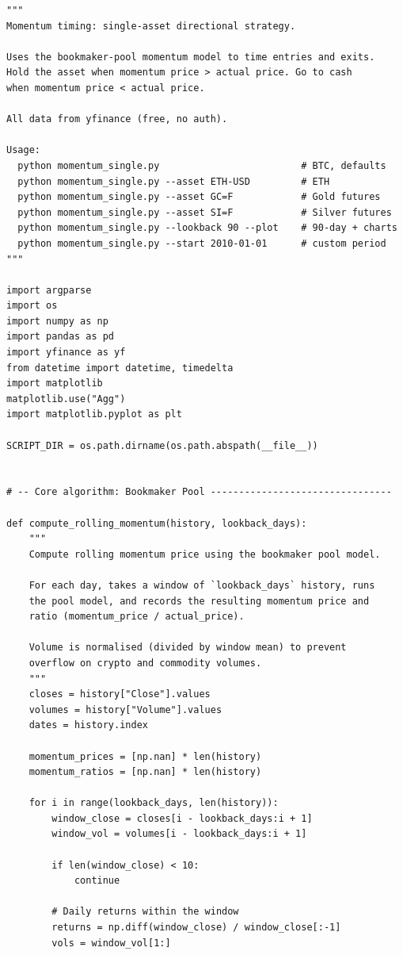 \documentclass[11pt,a4paper]{article}
\begin{document}
\begin{codebox}
\begin{lstlisting}[style=python]
"""
Momentum timing: single-asset directional strategy.

Uses the bookmaker-pool momentum model to time entries and exits.
Hold the asset when momentum price > actual price. Go to cash
when momentum price < actual price.

All data from yfinance (free, no auth).

Usage:
  python momentum_single.py                         # BTC, defaults
  python momentum_single.py --asset ETH-USD         # ETH
  python momentum_single.py --asset GC=F            # Gold futures
  python momentum_single.py --asset SI=F            # Silver futures
  python momentum_single.py --lookback 90 --plot    # 90-day + charts
  python momentum_single.py --start 2010-01-01      # custom period
"""

import argparse
import os
import numpy as np
import pandas as pd
import yfinance as yf
from datetime import datetime, timedelta
import matplotlib
matplotlib.use("Agg")
import matplotlib.pyplot as plt

SCRIPT_DIR = os.path.dirname(os.path.abspath(__file__))


# -- Core algorithm: Bookmaker Pool --------------------------------

def compute_rolling_momentum(history, lookback_days):
    """
    Compute rolling momentum price using the bookmaker pool model.

    For each day, takes a window of `lookback_days` history, runs
    the pool model, and records the resulting momentum price and
    ratio (momentum_price / actual_price).

    Volume is normalised (divided by window mean) to prevent
    overflow on crypto and commodity volumes.
    """
    closes = history["Close"].values
    volumes = history["Volume"].values
    dates = history.index

    momentum_prices = [np.nan] * len(history)
    momentum_ratios = [np.nan] * len(history)

    for i in range(lookback_days, len(history)):
        window_close = closes[i - lookback_days:i + 1]
        window_vol = volumes[i - lookback_days:i + 1]

        if len(window_close) < 10:
            continue

        # Daily returns within the window
        returns = np.diff(window_close) / window_close[:-1]
        vols = window_vol[1:]


\end{lstlisting}
\end{codebox}
\end{document}

